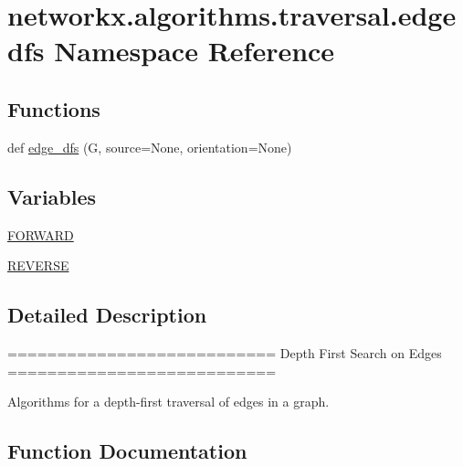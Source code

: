 \hypertarget{namespacenetworkx_1_1algorithms_1_1traversal_1_1edgedfs}{}\section{networkx.\+algorithms.\+traversal.\+edgedfs Namespace Reference}
\label{namespacenetworkx_1_1algorithms_1_1traversal_1_1edgedfs}
\subsection*{Functions}
\begin{DoxyCompactItemize}
\item 
def \hyperlink{namespacenetworkx_1_1algorithms_1_1traversal_1_1edgedfs_ab6b07efccd7e3fbc5f33f727f968f5ec}{edge\+\_\+dfs} (G, source=None, orientation=None)
\end{DoxyCompactItemize}
\subsection*{Variables}
\begin{DoxyCompactItemize}
\item 
\hyperlink{namespacenetworkx_1_1algorithms_1_1traversal_1_1edgedfs_a9feb95c3f6751c18a8529dd6a7ec86c9}{F\+O\+R\+W\+A\+RD}
\item 
\hyperlink{namespacenetworkx_1_1algorithms_1_1traversal_1_1edgedfs_ae537b9f1ca8411bbd4f0da3c8d25f219}{R\+E\+V\+E\+R\+SE}
\end{DoxyCompactItemize}


\subsection{Detailed Description}
\begin{DoxyVerb}===========================
Depth First Search on Edges
===========================

Algorithms for a depth-first traversal of edges in a graph.\end{DoxyVerb}
 

\subsection{Function Documentation}
\mbox{\label{namespacenetworkx_1_1algorithms_1_1traversal_1_1edgedfs_ab6b07efccd7e3fbc5f33f727f968f5ec}} 
